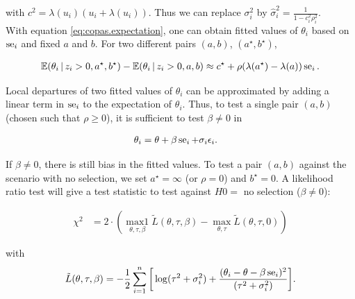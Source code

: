 \documentclass[11pt,a4paper,twoside]{book}\usepackage[]{graphicx}\usepackage[]{color}
\begin{document}
with $c^2 = \lambda(u_i)(u_i + \lambda(u_i))$. Thus we can replace $\sigma_i^2$ by $\hat{\sigma}_i^2 = \frac{1}{1-c_i^2\rho_i^2}$. \\ 
With equation \eqref{eq:copas.expectation}, one can obtain fitted values of $\theta_i$ based on $\operatorname{se}_i$ and fixed $a$ and $b$. For two different pairs $(a,b)$, $(a^\star, b^\star)$,

\begin{align}
\mathbb{E}(\theta_i\,\vert\, z_i > 0, a^\star, b^\star) - \mathbb{E}(\theta_i\,\vert\, z_i > 0, a, b) \approx c^\star + \rho(\lambda(a^\star) - \lambda(a))\operatorname{se}_i. \nonumber
\end{align}

Local departures of two fitted values of $\theta_i$ can be approximated by adding a linear term in $\operatorname{se}_i$ to the expectation of $\theta_i$. Thus, to test a single pair $(a,b)$ (chosen such that $\rho \geq 0$), it is sufficient to test $\beta \neq 0$ in

\begin{align}
\theta_i &= \theta + \beta \operatorname{se}_i + \sigma_i \epsilon_i. \nonumber
\end{align}

If $\beta \neq 0$, there is still bias in the fitted values. To test a pair $(a,b)$ against the scenario with no selection, we set $a^\star = \infty$ (or $\rho = 0$) and $b^\star = 0$. A likelihood ratio test will give a test statistic to test against $H0 =$ no selection ($\beta \neq 0$):

\begin{align}
\chi^2 &= 2\cdot(\operatorname*{max1}_{\theta, \tau, \beta}\tilde{L}(\theta, \tau, \beta) - \operatorname*{max}_{\theta, \tau}\tilde{L}(\theta, \tau, 0)) \label{eq:copas.small.study}
\end{align}

with 
\begin{align}
\tilde{L}(\theta, \tau, \beta) = -\frac{1}{2}\sum_{i = 1}^n\bigg[\log(\tau^2 + \sigma_i^2) + \frac{(\theta_i - \theta - \beta \operatorname{se}_i)^2}{(\tau^2 + \sigma_i^2)}\bigg]. \nonumber
\end{align}
\end{document}
